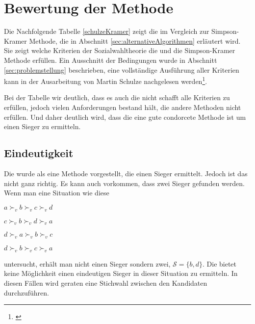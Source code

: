 \section{Bewertung der Methode}
\label{sec:Bewertung1}

Die Nachfolgende Tabelle \ref{schulzeKramer} zeigt die \schulze im Vergleich zur Simpson-Kramer Methode, die in Abschnitt \ref{sec:alternativeAlgorithmen} erläutert wird. Sie zeigt welche Kriterien der Sozialwahltheorie die \schulze und die Simpson-Kramer Methode erfüllen. Ein Ausschnitt der Bedingungen wurde in Abschnitt \ref{sec:problemstellung} beschrieben, eine vollständige Ausführung aller Kriterien kann in der Ausarbeitung von Martin Schulze nachgelesen werden\footnote{\Vgl \citet{Schulze2018}}.



Bei der Tabelle wir deutlich, dass es auch die \schulze nicht schafft alle Kriterien zu erfüllen, jedoch vielen Anforderungen bestand hält, die andere Methoden nicht erfüllen. Und daher deutlich wird, dass die \schulze eine gute condorcete Methode ist um einen Sieger zu ermitteln.
\newpage

\subsection{Eindeutigkeit}
\label{sec:eindeutigkeit}
Die \schulze wurde als eine Methode vorgestellt, die einen Sieger ermittelt. Jedoch ist das nicht ganz richtig. Es kann auch vorkommen, dass zwei Sieger gefunden werden. Wenn man eine Situation wie diese

\begin{description}
\centering
\item[3 mal] $a \succ_{v} b \succ_{v} c \succ_{v}d$
\item[2 mal] $c \succ_{v} b \succ_{v} d \succ_{v}a$
\item[2 mal] $d \succ_{v} a \succ_{v} b \succ_{v}c$
\item[2 mal] $d \succ_{v} b \succ_{v} c \succ_{v}a$
\end{description} 
untersucht, erhält man nicht einen Sieger sondern zwei, $\mathcal{S}=\{b,d\}$. Die \schulze bietet keine Möglichkeit einen eindeutigen Sieger in dieser Situation zu ermitteln. In diesen Fällen wird geraten eine Stichwahl zwischen den Kandidaten durchzuführen.
